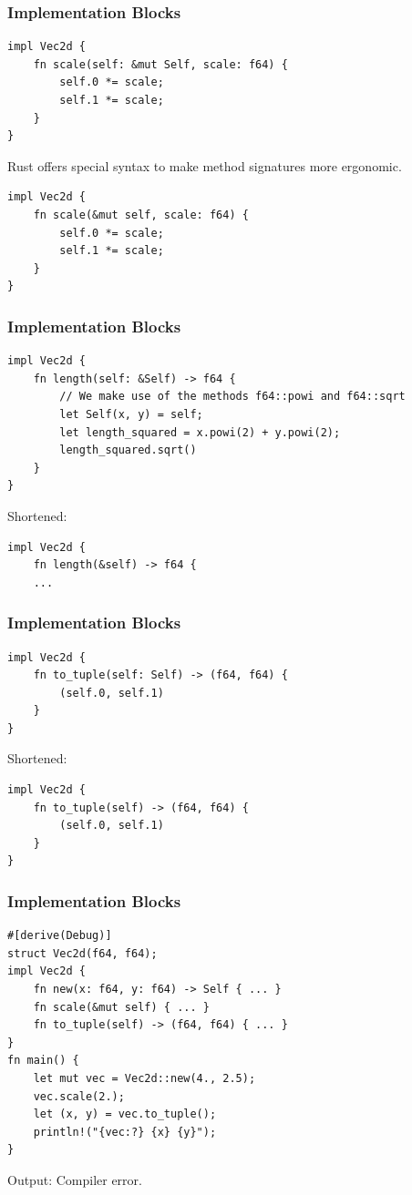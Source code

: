 \begin{frame}[fragile]
    \frametitle{Implementation Blocks}
    \begin{verbatim}
impl Vec2d {
    fn scale(self: &mut Self, scale: f64) {
        self.0 *= scale;
        self.1 *= scale;
    }
}
    \end{verbatim}
    \pause
    \vfill
    Rust offers special syntax to make method signatures more ergonomic.
    \begin{verbatim}
impl Vec2d {
    fn scale(&mut self, scale: f64) {
        self.0 *= scale;
        self.1 *= scale;
    }
}
    \end{verbatim}
\end{frame}

\begin{frame}[fragile]
    \frametitle{Implementation Blocks}
    \begin{verbatim}
impl Vec2d {
    fn length(self: &Self) -> f64 {
        // We make use of the methods f64::powi and f64::sqrt
        let Self(x, y) = self;
        let length_squared = x.powi(2) + y.powi(2);
        length_squared.sqrt()
    }
}
    \end{verbatim}
    \pause
    \vfill
    Shortened:
    \begin{verbatim}
impl Vec2d {
    fn length(&self) -> f64 {
    ...
    \end{verbatim}
\end{frame}

\begin{frame}[fragile]
    \frametitle{Implementation Blocks}
    \begin{verbatim}
impl Vec2d {
    fn to_tuple(self: Self) -> (f64, f64) {
        (self.0, self.1)
    }
}
    \end{verbatim}
    \pause
    \vfill
    Shortened:
    \begin{verbatim}
impl Vec2d {
    fn to_tuple(self) -> (f64, f64) {
        (self.0, self.1)
    }
}
    \end{verbatim}
\end{frame}

\begin{frame}[fragile]
    \frametitle{Implementation Blocks}
    \begin{verbatim}
#[derive(Debug)]
struct Vec2d(f64, f64);
impl Vec2d {
    fn new(x: f64, y: f64) -> Self { ... }
    fn scale(&mut self) { ... }
    fn to_tuple(self) -> (f64, f64) { ... }
}
fn main() {
    let mut vec = Vec2d::new(4., 2.5);
    vec.scale(2.);
    let (x, y) = vec.to_tuple();
    println!("{vec:?} {x} {y}");
}
    \end{verbatim}
    \pause
    \vfill
    Output:
    \pause
    Compiler error.
\end{frame}

